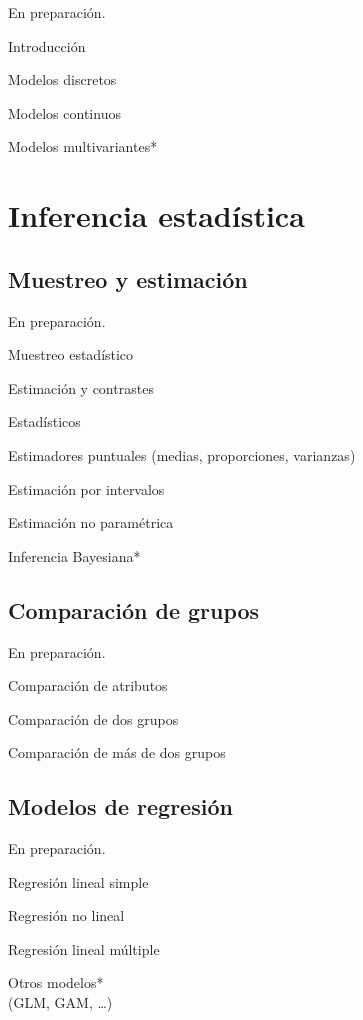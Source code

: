 \documentclass[
]{book}
\begin{document}
En preparación.

Introducción

Modelos discretos

Modelos continuos

Modelos multivariantes*

\hypertarget{part-inferencia-estaduxedstica}{%
\part{Inferencia estadística}\label{part-inferencia-estaduxedstica}}

\hypertarget{muestreo}{%
\chapter{Muestreo y estimación}\label{muestreo}}

En preparación.

Muestreo estadístico

Estimación y contrastes

Estadísticos

Estimadores puntuales (medias, proporciones, varianzas)

Estimación por intervalos

Estimación no paramétrica

Inferencia Bayesiana*

\hypertarget{comparacion}{%
\chapter{Comparación de grupos}\label{comparacion}}

En preparación.

Comparación de atributos

Comparación de dos grupos

Comparación de más de dos grupos

\hypertarget{regresion}{%
\chapter{Modelos de regresión}\label{regresion}}

En preparación.

Regresión lineal simple

Regresión no lineal

Regresión lineal múltiple

Otros modelos*\\
(GLM, GAM, \ldots)
\end{document}
